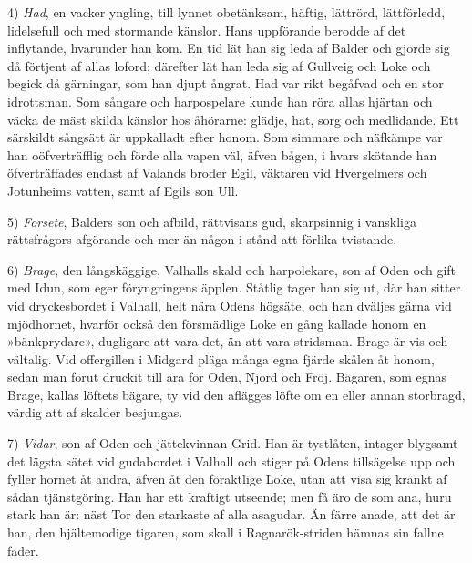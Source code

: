 4) \emph{Had}, en vacker yngling, till lynnet obetänksam, häftig,
lättrörd, lättförledd, lidelsefull och med stormande känslor. Hans
uppförande berodde af det inflytande, hvarunder han kom. En tid lät han
sig leda af Balder och gjorde sig då förtjent af allas loford; därefter
lät han leda sig af Gullveig och Loke och begick då gärningar, som han
djupt ångrat. Had var rikt begåfvad och en stor idrottsman. Som sångare
och harpospelare kunde han röra allas hjärtan och väcka de mäst skilda
känslor hos åhörarne: glädje, hat, sorg och medlidande. Ett särskildt
sångsätt är uppkalladt efter honom. Som simmare och näfkämpe var han
oöfverträfflig och förde alla vapen väl, äfven bågen, i hvars skötande
han öfverträffades endast af Valands broder Egil, väktaren vid
Hvergelmers och Jotunheims vatten, samt af Egils son Ull.

\protect\hypertarget{lb1625905.xhtmlux5cux23start30}{}{}\protect\hypertarget{lb1625905.xhtmlux5cux23start30-a}{}{}\protect\hypertarget{lb1625905.xhtmlux5cux23start30-b}{}{}\protect\hypertarget{lb1625905.xhtmlux5cux23start30-c}{}{}\protect\hypertarget{lb1625905.xhtmlux5cux23start30-d}{}{}

5) \emph{Forsete}, Balders son och afbild, rättvisans gud, skarpsinnig i
vanskliga rättsfrågors afgörande och mer än någon i stånd att förlika
tvistande.

6) \emph{Brage}, den långskäggige, Valhalls skald och harpolekare, son
af Oden och gift med Idun, som eger föryngringens äpplen. Ståtlig tager
han sig ut, där han sitter vid dryckesbordet i Valhall, helt nära Odens
högsäte, och han dväljes gärna vid mjödhornet, hvarför också den
försmädlige Loke en gång kallade honom en »bänkprydare», dugligare att
vara det, än att vara stridsman. Brage är vis och vältalig. Vid
offergillen i Midgard pläga många egna fjärde skålen åt honom, sedan man
förut druckit till ära för Oden, Njord och Fröj. Bägaren, som egnas
Brage, kallas löftets bägare, ty vid den aflägges löfte om en eller
annan storbragd, värdig att af skalder besjungas.

7) \emph{Vidar}, son af Oden och jättekvinnan Grid. Han är tystlåten,
intager blygsamt det lägsta sätet vid gudabordet i Valhall och stiger på
Odens tillsägelse upp och fyller hornet åt andra, äfven åt den
föraktlige Loke, utan att visa sig kränkt af sådan tjänstgöring. Han har
ett kraftigt utseende; men få äro de som ana, huru stark han är: näst
Tor den starkaste af alla asagudar. Än färre anade, att det är han, den
hjältemodige tigaren, som skall i Ragnarök-striden hämnas sin fallne
fader.

